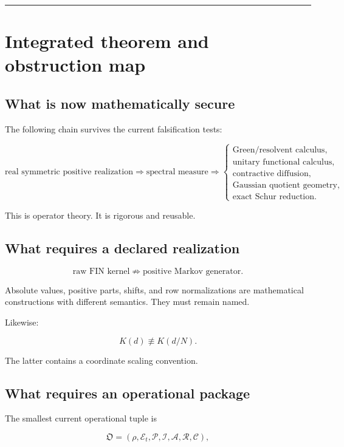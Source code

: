 \documentclass[11pt,a4paper,openany]{report}
\begin{document}
\par\medskip\hrule\medskip

\chapter{Integrated theorem and obstruction map}

\section{What is now mathematically secure}

The following chain survives the current falsification tests:

\[
\text{real symmetric positive realization}
\Longrightarrow
\text{spectral measure}
\Longrightarrow
\begin{cases}
\text{Green/resolvent calculus},\\
\text{unitary functional calculus},\\
\text{contractive diffusion},\\
\text{Gaussian quotient geometry},\\
\text{exact Schur reduction}.
\end{cases}
\]

This is operator theory. It is rigorous and reusable.

\section{What requires a declared realization}

\[
\text{raw FIN kernel}
\not\Longrightarrow
\text{positive Markov generator}.
\]

Absolute values, positive parts, shifts, and row normalizations are mathematical constructions with different semantics. They must remain named.

Likewise:

\[
K(d)
\not\equiv
K(d/N).
\]

The latter contains a coordinate scaling convention.

\section{What requires an operational package}

The smallest current operational tuple is

\[
\mathfrak O
=
(\rho,\mathcal E_t,\mathcal P,\mathcal I,\mathcal A,\mathcal R,\mathcal C),
\]
\end{document}
